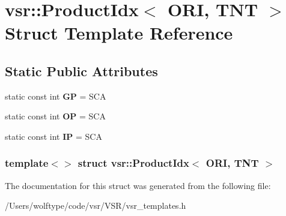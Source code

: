 \hypertarget{structvsr_1_1_product_idx_3_01_o_r_i_00_01_t_n_t_01_4}{\section{vsr\-:\-:Product\-Idx$<$ O\-R\-I, T\-N\-T $>$ Struct Template Reference}
\label{structvsr_1_1_product_idx_3_01_o_r_i_00_01_t_n_t_01_4}
}
\subsection*{Static Public Attributes}
\begin{DoxyCompactItemize}
\item 
\hypertarget{structvsr_1_1_product_idx_3_01_o_r_i_00_01_t_n_t_01_4_a03a6e079bf84c58170bc4256fd2bd6c3}{static const int {\bfseries G\-P} = S\-C\-A}\label{structvsr_1_1_product_idx_3_01_o_r_i_00_01_t_n_t_01_4_a03a6e079bf84c58170bc4256fd2bd6c3}

\item 
\hypertarget{structvsr_1_1_product_idx_3_01_o_r_i_00_01_t_n_t_01_4_aab9b8fba1f3cd1f95a5cf9ccefa97094}{static const int {\bfseries O\-P} = S\-C\-A}\label{structvsr_1_1_product_idx_3_01_o_r_i_00_01_t_n_t_01_4_aab9b8fba1f3cd1f95a5cf9ccefa97094}

\item 
\hypertarget{structvsr_1_1_product_idx_3_01_o_r_i_00_01_t_n_t_01_4_a703bbaf98cc25c8c9cee7b7fc639aa44}{static const int {\bfseries I\-P} = S\-C\-A}\label{structvsr_1_1_product_idx_3_01_o_r_i_00_01_t_n_t_01_4_a703bbaf98cc25c8c9cee7b7fc639aa44}

\end{DoxyCompactItemize}
\subsubsection*{template$<$$>$ struct vsr\-::\-Product\-Idx$<$ O\-R\-I, T\-N\-T $>$}



The documentation for this struct was generated from the following file\-:\begin{DoxyCompactItemize}
\item 
/\-Users/wolftype/code/vsr/\-V\-S\-R/vsr\-\_\-templates.\-h\end{DoxyCompactItemize}
